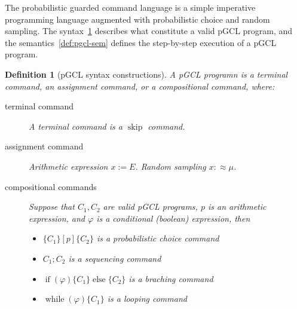 \documentclass[a4paper]{article}
\newtheorem{definition}[theorem]{Definition}
\begin{document}
The probabilistic guarded command language\cite{pgcl} is a simple imperative programming language augmented with probabilistic choice and random sampling. The syntax~\ref{def:pgcl-syn} describes what constitute a valid pGCL program, and the semantics~\ref{def:pgcl-sem} defines the step-by-step execution of a pGCL program.
\begin{definition}[pGCL syntax constructions]\label{def:pgcl-syn}
	A pGCL programn is a terminal command,
	an assignment command,
	or a compositional command, where:
	\begin{description}
		\item[terminal command] A terminal command is a \(\operatorname{skip}\) command.
		\item[assignment command] Arithmetic expression \(x:=E\). Random sampling \(x :\approx \mu\).
		\item[compositional commands] Suppose that \(C_1,C_2\) are valid pGCL programs, \(p\) is an arithmetic expression, and \(\varphi\) is a conditional (boolean) expression, then
		      \begin{itemize}
			      \item \(\{C_1\}[p]\{C_2\}\) is a probabilistic choice command
			      \item \(C_1;C_2\) is a sequencing command
			      \item \(\operatorname{if}(\varphi)\{C_1\}\operatorname{else}\{C_2\}\) is a braching command
			      \item \(\operatorname{while}(\varphi)\{C_1\}\) is a looping command
		      \end{itemize}
	\end{description}
\end{definition}
\end{document}
